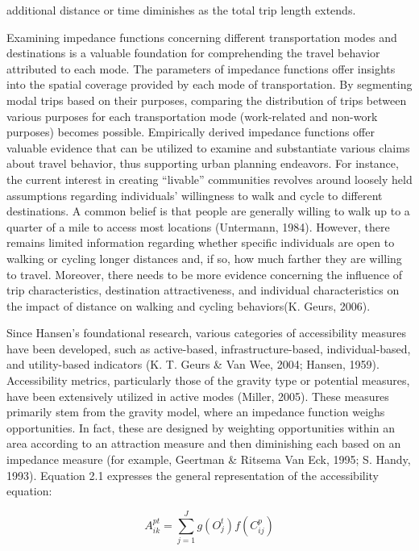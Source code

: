 \documentclass[
11pt, %
oneside, %
english, %
singlespacing, %
]{macthesis} %
\begin{document}
additional distance or time diminishes as the total trip length extends.

Examining impedance functions concerning different transportation modes and destinations is a valuable foundation for comprehending the travel behavior attributed to each mode. The parameters of impedance functions offer insights into the spatial coverage provided by each mode of transportation. By segmenting modal trips based on their purposes, comparing the distribution of trips between various purposes for each transportation mode (work-related and non-work purposes) becomes possible. Empirically derived impedance functions offer valuable evidence that can be utilized to examine and substantiate various claims about travel behavior, thus supporting urban planning endeavors. For instance, the current interest in creating ``livable'' communities revolves around loosely held assumptions regarding individuals' willingness to walk and cycle to different destinations. A common belief is that people are generally willing to walk up to a quarter of a mile to access most locations (Untermann, 1984). However, there remains limited information regarding whether specific individuals are open to walking or cycling longer distances and, if so, how much farther they are willing to travel. Moreover, there needs to be more evidence concerning the influence of trip characteristics, destination attractiveness, and individual characteristics on the impact of distance on walking and cycling behaviors(K. Geurs, 2006).

Since Hansen's foundational research, various categories of accessibility measures have been developed, such as active-based, infrastructure-based, individual-based, and utility-based indicators (K. T. Geurs \& Van Wee, 2004; Hansen, 1959). Accessibility metrics, particularly those of the gravity type or potential measures, have been extensively utilized in active modes (Miller, 2005). These measures primarily stem from the gravity model, where an impedance function weighs opportunities. In fact, these are designed by weighting opportunities within an area according to an attraction measure and then diminishing each based on an impedance measure (for example, Geertman \& Ritsema Van Eck, 1995; S. Handy, 1993). Equation 2.1 expresses the general representation of the accessibility equation:

\begin{equation}
A_{ik}^{pt} = \sum_{j=1}^J g(O_j^t) f(C_{ij}^p)
\label{eq:gen}
\end{equation}
\end{document}
